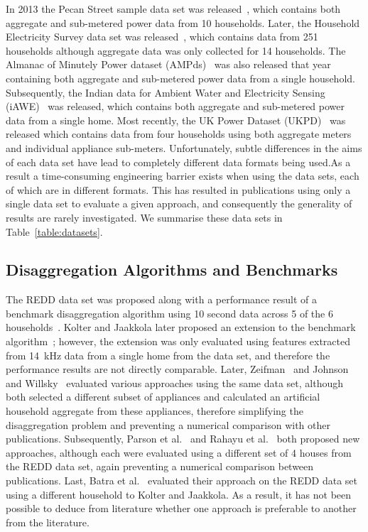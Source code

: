 \documentclass{sig-alternate}
\newcommand{\bluecolor}[1]{\textcolor{blue}{#1}}
\newcommand{\tabref}[1]{Table~\ref{#1}}
\begin{document}
In 2013 the Pecan Street sample data set was released~\cite{pecan}, which contains both aggregate and sub-metered power data from 10 households. Later, the Household Electricity Survey data set was released~\cite{hes}, which contains data from 251 households although aggregate data was only collected for 14 households. The Almanac of Minutely Power dataset (AMPds)~\cite{ampds} was also released that year containing both aggregate and sub-metered power data from a single household. Subsequently, the Indian data for Ambient Water and Electricity Sensing (iAWE)~\cite{iawe} was released, which contains both aggregate and sub-metered power data from a single home. Most recently, the UK Power Dataset (UKPD)~\cite{ukpd} was released which contains data from four households using both aggregate meters and individual appliance sub-meters. Unfortunately, subtle differences in the aims of each data set have lead to completely different data formats being used.As a result a time-consuming engineering barrier exists when using the data sets, each of which are in different formats. This has resulted in publications using only a single data set to evaluate a given approach, and consequently the generality of results are rarely investigated. We summarise these data sets in \tabref{table:datasets}.

\subsection{Disaggregation Algorithms and Benchmarks}
\label{sec:algorithms}
\noindent The REDD data set was proposed along with a performance result of a benchmark disaggregation algorithm using 10 second data across 5 of the 6 households~\cite{redd}. Kolter and Jaakkola later proposed an extension to the benchmark algorithm~\cite{kolter_2012}; however, the extension was only evaluated using features extracted from 14~kHz data from a single home from the data set, and therefore the performance results are not directly comparable. Later, Zeifman~\cite{zeifman_2012} and Johnson and Willsky~\cite{johnson_2013} evaluated various approaches using the same data set, although both selected a different subset of appliances and calculated an artificial household aggregate from these appliances, therefore simplifying the disaggregation problem and preventing a numerical comparison with other publications. Subsequently, Parson et al.~\cite{parson_2012} and Rahayu et al.~\cite{rahayu_2012} both proposed new approaches, although each were evaluated using a different set of 4 houses from the REDD data set, again preventing a numerical comparison between publications. Last, Batra et al.~\cite{batra_2013} evaluated their approach on the REDD data set using a different household to Kolter and Jaakkola. As a result, it has not been possible to deduce from literature whether one approach is preferable to another from the literature.
\end{document}
